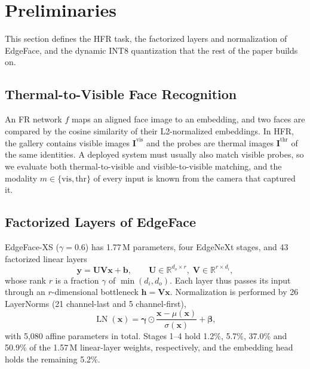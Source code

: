 \documentclass[journal]{IEEEtran}
\newcommand{\R}{\mathbb{R}}
\newcommand{\vect}[1]{\bm{#1}}
\newcommand{\vis}{\text{vis}}
\newcommand{\thr}{\text{thr}}
\newcommand{\LN}{\operatorname{LN}}
\begin{document}
\section{Preliminaries}
\label{sec:prelim}
This section defines the HFR task, the factorized layers and normalization of EdgeFace, and the dynamic INT8 quantization that the rest of the paper builds on.

\subsection{Thermal-to-Visible Face Recognition}
An FR network $f$ maps an aligned face image to an embedding, and two faces are compared by the cosine similarity of their L2-normalized embeddings. In HFR, the gallery contains visible images $\vect{I}^{\vis}$ and the probes are thermal images $\vect{I}^{\thr}$ of the same identities. A deployed system must usually also match visible probes, so we evaluate both thermal-to-visible and visible-to-visible matching, and the modality $m\in\{\vis,\thr\}$ of every input is known from the camera that captured it.

\subsection{Factorized Layers of EdgeFace}
EdgeFace-XS ($\gamma=0.6$) \cite{george2024edgeface} has 1.77\,M parameters, four EdgeNeXt stages, and 43 factorized linear layers
\begin{equation}
  \vect{y} = \vect{U}\vect{V}\vect{x} + \vect{b}, \qquad \vect{U}\in\R^{d_o\times r},\; \vect{V}\in\R^{r\times d_i},
  \label{eq:loralin}
\end{equation}
whose rank $r$ is a fraction $\gamma$ of $\min(d_i,d_o)$. Each layer thus passes its input through an $r$-dimensional bottleneck $\vect{h}=\vect{V}\vect{x}$. Normalization is performed by 26 LayerNorms (21 channel-last and 5 channel-first),
\begin{equation}
  \LN(\vect{x}) = \vect{\gamma}\odot\frac{\vect{x}-\mu(\vect{x})}{\sigma(\vect{x})} + \vect{\beta},
  \label{eq:ln}
\end{equation}
with 5{,}080 affine parameters in total. Stages 1--4 hold 1.2\%, 5.7\%, 37.0\% and 50.9\% of the 1.57\,M linear-layer weights, respectively, and the embedding head holds the remaining 5.2\%.
\end{document}
